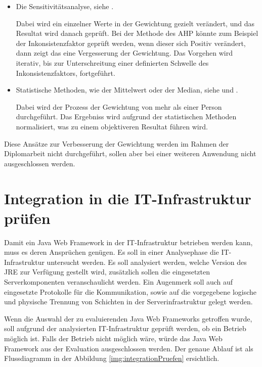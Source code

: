   \begin{itemize}
    \item Die Sensitivitätsanalyse, siehe \cite{Sensitivitaetsanalyse}.
    
    Dabei wird ein einzelner Werte in der Gewichtung gezielt verändert, und das
    Resultat wird danach geprüft. Bei der Methode des \ac{AHP} könnte zum
    Beispiel der Inkonsistenzfaktor geprüft werden, wenn dieser sich Positiv
    verändert, dann zeigt das eine Vergesserung der Gewichtung. Das Vorgehen
    wird iterativ, bis zur Unterschreitung einer definierten Schwelle des
    Inkonsistenzfaktors, fortgeführt.
    
    \item Statistische Methoden, wie der Mittelwert oder der Median, siehe
    \cite{Median} und \cite{Mittelwert}.
    
    Dabei wird der Prozess der Gewichtung von mehr als einer Person
    durchgeführt. Das Ergebniss wird aufgrund der statistischen Methoden
    normalisiert, was zu einem objektiveren Resultat führen wird.
  \end{itemize}
  
  Diese Ansätze zur Verbesserung der Gewichtung werden im Rahmen der
  Diplomarbeit nicht durchgeführt, sollen aber bei einer weiteren Anwendung
  nicht ausgeschlossen werden.
  
  \section{Integration in die IT-Infrastruktur prüfen}
  
  Damit ein Java Web Framework in der IT-Infrastruktur betrieben werden kann,
  muss es deren Ansprüchen genügen. Es soll in einer Analysephase die
  IT-Infrastruktur untersucht werden. Es soll analysiert werden, welche Version
  des \ac{JRE} zur Verfügung gestellt wird, zusätzlich sollen die eingesetzten
  Serverkomponenten veranschaulicht werden. Ein Augenmerk soll auch auf
  eingesetzte Protokolle für die Kommunikation, sowie auf die vorgegebene
  logische und physische Trennung von Schichten in der Serverinfrastruktur
  gelegt werden.
  
  Wenn die Auswahl der zu evaluierenden Java Web Frameworks getroffen wurde,
  soll aufgrund der analysierten IT-Infrastruktur geprüft werden, ob ein Betrieb
  möglich ist. Falls der Betrieb nicht möglich wäre, würde das Java Web
  Framework aus der Evaluation ausgeschlossen werden. Der genaue Ablauf ist als
  Flussdiagramm in der Abbildung \ref{img:integrationPruefen} ersichtlich.
  
